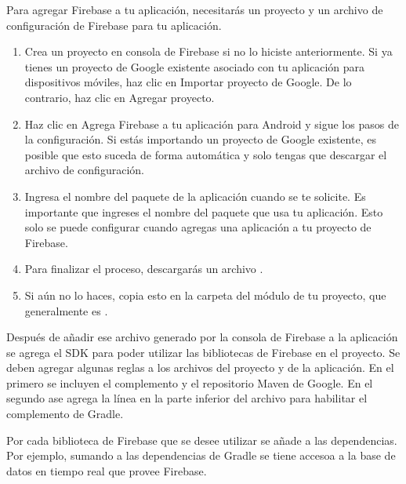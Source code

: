 Para agregar Firebase a tu aplicación, necesitarás un proyecto y un archivo de
configuración de Firebase para tu aplicación.
\begin{enumerate}
\item {} 
Crea un proyecto en consola de Firebase si no lo hiciste anteriormente. Si ya tienes un proyecto de Google existente asociado con tu aplicación para dispositivos móviles, haz clic en Importar proyecto de Google. De lo contrario, haz clic en Agregar proyecto.

\item {} 
Haz clic en Agrega Firebase a tu aplicación para Android y sigue los pasos de la configuración. Si estás importando un proyecto de Google existente, es posible que esto suceda de forma automática y solo tengas que descargar el archivo de configuración.

\item {} 
Ingresa el nombre del paquete de la aplicación cuando se te solicite. Es importante que ingreses el nombre del paquete que usa tu aplicación. Esto solo se puede configurar cuando agregas una aplicación a tu proyecto de Firebase.

\item {} 
Para finalizar el proceso, descargarás un archivo .

\item {} 
Si aún no lo haces, copia esto en la carpeta del módulo de tu proyecto, que generalmente es .

\end{enumerate}

Después de añadir ese archivo generado por la consola de Firebase a la aplicación
se agrega el SDK para poder utilizar las bibliotecas de Firebase en el proyecto.
Se deben agregar algunas reglas a los archivos  del proyecto
y de la aplicación. En el primero se incluyen el complemento 
y el repositorio Maven de Google. En el segundo ase agrega la línea
 en la parte inferior del archivo para habilitar el complemento
de Gradle.

Por cada biblioteca de Firebase que se desee utilizar se añade a las dependencias.
Por ejemplo, sumando a las dependencias de Gradle  
se tiene accesoa a la base de datos en tiempo real que provee Firebase.


